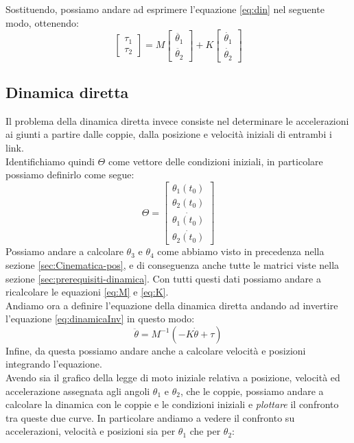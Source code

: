Sostituendo, possiamo andare ad esprimere l'equazione \ref{eq:din} nel seguente modo, ottenendo:
\begin{equation}
    \begin{bmatrix}
    \tau_1 \\ \tau_2
    \end{bmatrix} = 
    M\begin{bmatrix}
    \ddot{\theta_1} \\ \ddot{\theta_2}
    \end{bmatrix}
    + K \begin{bmatrix}
    \dot{\theta_1} \\ \dot{\theta_2}
    \end{bmatrix}
\end{equation}
\subsection{Dinamica diretta}
Il problema della dinamica diretta invece consiste nel determinare le accelerazioni ai giunti a partire dalle coppie, dalla posizione e velocità iniziali di entrambi i link.
\\Identifichiamo quindi $\Theta$ come vettore delle condizioni iniziali, in particolare possiamo definirlo come segue:
\begin{equation*}
    \Theta = \begin{bmatrix}
    \theta_1(t_0) \\ \theta_2(t_0) \\ \dot{\theta_1(t_0)} \\ \dot{\theta_2(t_0)}
    \end{bmatrix}
\end{equation*}
Possiamo andare a calcolare $\theta_3$ e $\theta_4$ come abbiamo visto in precedenza nella sezione \ref{sec:Cinematica-pos}, e di conseguenza anche tutte le matrici viste nella sezione \ref{sec:prerequisiti-dinamica}. Con tutti questi dati possiamo andare a ricalcolare le equazioni \ref{eq:M} e \ref{eq:K}. 
\\Andiamo ora a definire l'equazione della dinamica diretta andando ad invertire l'equazione \ref{eq:dinamicaInv} in questo modo:
\begin{equation}
    \ddot{\theta} = M^{-1}(-K\dot{\theta}+\tau)
    \label{eq:dinamicaDiretta}
\end{equation}
Infine, da questa possiamo andare anche a calcolare velocità e posizioni integrando l'equazione.
\\Avendo sia il grafico della legge di moto iniziale relativa a posizione, velocità ed accelerazione assegnata agli angoli $\theta_1$ e $\theta_2$, che le coppie, possiamo andare a calcolare la dinamica con le coppie e le condizioni iniziali e \textit{plottare} il confronto tra queste due curve. In particolare andiamo a vedere il confronto su accelerazioni, velocità e posizioni sia per $\theta_1$ che per $\theta_2$: 
